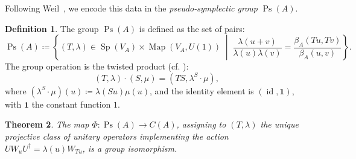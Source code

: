 \documentclass[11pt, reqno]{amsart}
\newtheorem{theorem}{Theorem}[section]
\theoremstyle{definition}
\newtheorem{definition}[theorem]{Definition}
\theoremstyle{remark}
\DeclareMathOperator{\Map}{Map}
\DeclareMathOperator{\Sp}{Sp}
\DeclareMathOperator{\Ps}{Ps}
\DeclareMathOperator{\id}{id}
\begin{document}
Following Weil~\cite{Weil1964}, we encode this data in the \emph{pseudo-symplectic group} $\Ps(A)$.

\begin{definition}
The group $\Ps(A)$ is defined as the set of pairs:
\begin{equation}
\Ps(A) \coloneqq \left\{ (T, \lambda) \in \Sp(V_A) \times \Map(V_A,U(1)) \;\middle|\; \frac{\lambda(u+v)}{\lambda(u)\lambda(v)} = \frac{\beta_A(Tu, Tv)}{\beta_A(u, v)} \right\}.
\end{equation}
The group operation is the twisted product (cf. \cite[Eq.~7]{Weil1964}):
\begin{equation}\label{eq:twisted-product}
    (T, \lambda) \cdot (S, \mu) = (TS, \lambda^S \cdot \mu),
\end{equation}
where $(\lambda^S \cdot \mu)(u) \coloneqq \lambda(Su)\mu(u)$, and the identity element is $(\id,\mathbf{1})$, with $\mathbf{1}$ the constant function $1$.
\end{definition}

\begin{theorem}\label{thm:clifford-structure}
The map $\Phi: \Ps(A) \to C(A)$, assigning to $(T, \lambda)$ the unique projective class of unitary operators implementing the action $U W_u U^\dagger = \lambda(u) W_{Tu}$, is a group isomorphism.
\end{theorem}
\end{document}
